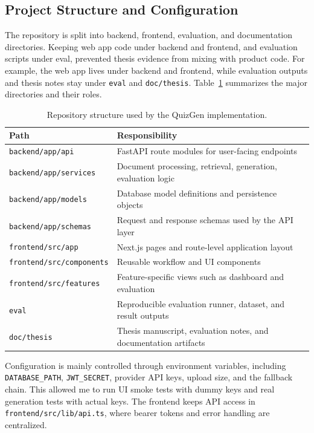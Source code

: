 \documentclass[12pt,a4paper]{article}
\begin{document}
\subsection{Project Structure and Configuration}

The repository is split into backend, frontend, evaluation, and
documentation directories. Keeping web app code under backend and frontend, and evaluation
scripts under eval, prevented thesis evidence from mixing with product
code. For example, the web app lives under backend and
frontend, while evaluation outputs and thesis notes stay under
\texttt{eval} and \texttt{doc/thesis}. Table~\ref{tab:project-structure}
summarizes the major directories and their roles.

\begin{table}[H]
  \centering
  \singlespacing
  \caption{Repository structure used by the QuizGen implementation.}
  \label{tab:project-structure}
  \small
  \begin{tabular}{@{}p{4.8cm}p{8.6cm}@{}}
    \toprule
    \textbf{Path} & \textbf{Responsibility} \\
    \midrule
    \texttt{backend/app/api} & FastAPI route modules for user-facing endpoints \\
    \texttt{backend/app/services} & Document processing, retrieval, generation, evaluation logic \\
    \texttt{backend/app/models} & Database model definitions and persistence objects \\
    \texttt{backend/app/schemas} & Request and response schemas used by the API layer \\
    \texttt{frontend/src/app} & Next.js pages and route-level application layout \\
    \texttt{frontend/src/components} & Reusable workflow and UI components \\
    \texttt{frontend/src/features} & Feature-specific views such as dashboard and evaluation \\
    \texttt{eval} & Reproducible evaluation runner, dataset, and result outputs \\
    \texttt{doc/thesis} & Thesis manuscript, evaluation notes, and documentation artifacts \\
    \bottomrule
  \end{tabular}
\end{table}

Configuration is mainly controlled through environment variables, including
\texttt{DATABASE\_PATH}, \texttt{JWT\_SECRET}, provider API keys, upload
size, and the fallback chain. This allowed me to run UI smoke tests with
dummy keys and real generation tests with actual keys. The frontend keeps
API access in \texttt{frontend/src/lib/api.ts}, where bearer tokens and
error handling are centralized.
\end{document}

